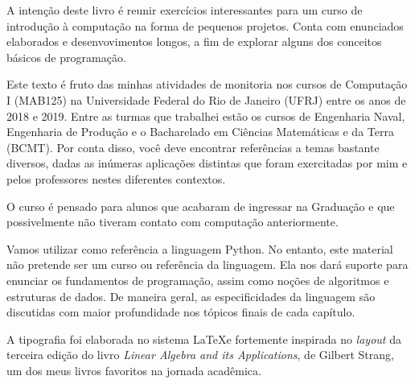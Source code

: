\preface%
    A intenção deste livro é reunir exercícios interessantes para um curso de introdução à computação na forma de pequenos projetos. Conta com enunciados elaborados e desenvovimentos longos, a fim de explorar alguns dos conceitos básicos de programação. \par

    Este texto é fruto das minhas atividades de monitoria nos cursos de Computação I (MAB125) na Universidade Federal do Rio de Janeiro (UFRJ) entre os anos de 2018 e 2019. Entre as turmas que trabalhei estão os cursos de Engenharia Naval, Engenharia de Produção e o Bacharelado em Ciências Matemáticas e da Terra (BCMT). Por conta disso, você deve encontrar referências a temas bastante diversos, dadas as inúmeras aplicações distintas que foram exercitadas por mim e pelos professores nestes diferentes contextos. \par

    O curso é pensado para alunos que acabaram de ingressar na Graduação e que possivelmente não tiveram contato com computação anteriormente. \par

    Vamos utilizar como referência a linguagem Python. No entanto, este material não pretende ser um curso ou referência da linguagem. Ela nos dará suporte para enunciar os fundamentos de programação, assim como noções de algoritmos e estruturas de dados. De maneira geral, as especificidades da linguagem são discutidas com maior profundidade nos tópicos finais de cada capítulo. \par

    A tipografia foi elaborada no sistema \LaTeX e fortemente inspirada no \textit{layout} da terceira edição do livro \textit{Linear Algebra and its Applications}\cite{strang:1988}, de Gilbert Strang, um dos meus livros favoritos na jornada acadêmica. \par

